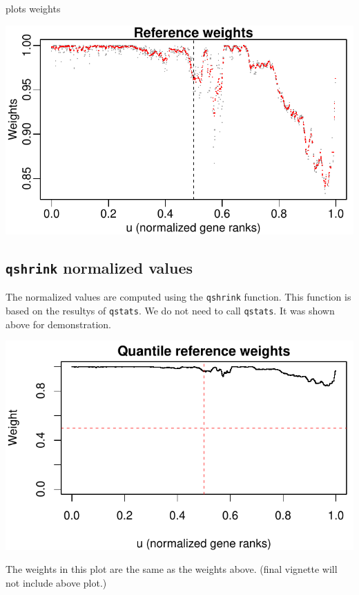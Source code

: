 \documentclass{article}\usepackage[]{graphicx}\usepackage[usenames,dvipsnames]{color}
\makeatletter
\def\maxwidth{ %
  \ifdim\Gin@nat@width>\linewidth
    \linewidth
  \else
    \Gin@nat@width
  \fi
}
\newenvironment{knitrout}{}{} %
\makeatother
\begin{document}
plots weights
\begin{knitrout}
\color{fgcolor}

{\centering \includegraphics[width=\maxwidth]{figure/weights-1} 

}



\end{knitrout}


\subsection{\texttt{qshrink} normalized values}

The normalized values are computed using the 
\texttt{qshrink} function. 
This function is based on the resultys of \texttt{qstats}.
We do not need to call \texttt{qstats}. It was shown 
above for demonstration.

\begin{knitrout}
\color{fgcolor}

{\centering \includegraphics[width=\maxwidth]{figure/qshrikage-1} 

}



\end{knitrout}
The weights in this plot are the same as the weights above. 
(final vignette will not include above plot.)
\end{document}

